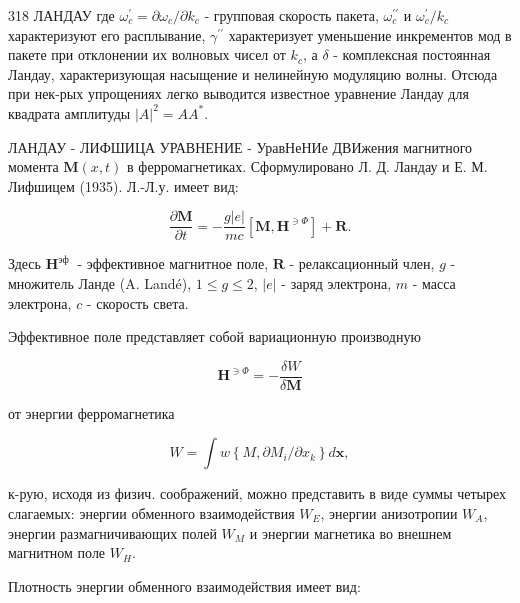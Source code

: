 \documentclass[10pt]{article}
\begin{document}
318 ЛАНДАУ где $\omega_{c}^{\prime}=\partial \omega_{c} / \partial k_{c}$ - групповая скорость пакета, $\omega_{c}^{\prime \prime}$ и $\omega_{c}^{\prime} / k_{c}$ характеризуют его расплывание, $\gamma^{\prime \prime}$ характеризует уменьшение инкрементов мод в пакете при отклонении их волновых чисел от $k_{c}$, а $\delta$ - комплексная постоянная Ландау, характеризующая насыщение и нелинейную модуляцию волны. Отсюда при нек-рых упрощениях легко выводится известное уравнение Ландау для квадрата амплитуды $|A|^{2}=A A^{*}$.



ЛАНДАУ - ЛИФШИЦА УРАВНЕНИЕ - УравНеНИе ДВИжения магнитного момента $\boldsymbol{M}(x, t)$ в ферромагнетиках. Сформулировано Л. Д. Ландау и Е. М. Лифшицем (1935). Л.-Л.у. имеет вид:



\[

\frac{\partial \boldsymbol{M}}{\partial t}=-\frac{g|e|}{m c}\left[\boldsymbol{M}, \boldsymbol{H}^{\ni \Phi}\right]+\boldsymbol{R} .

\]



Здесь $\boldsymbol{H}^{\text {эф }}$ - эффективное магнитное поле, $\boldsymbol{R}$ - релаксационный член, $g$ - множитель Ланде (A. Landé), $1 \leqslant g \leqslant 2$, $|e|$ - заряд электрона, $m$ - масса электрона, $c$ - скорость света.



Эффективное поле представляет собой вариационную производную



\[

\boldsymbol{H}^{\ni \Phi}=-\frac{\delta W}{\delta \boldsymbol{M}}

\]



от энергии ферромагнетика



\[

W=\int w\left\{M, \partial M_{i} / \partial x_{k}\right\} d \boldsymbol{x},

\]



к-рую, исходя из физич. соображений, можно представить в виде суммы четырех слагаемых: энергии обменного взаимодействия $W_{E}$, энергии анизотропии $W_{A}$, энергии размагничивающих полей $W_{M}$ и энергии магнетика во внешнем магнитном поле $W_{H}$.



Плотность энергии обменного взаимодействия имеет вид:
\end{document}
